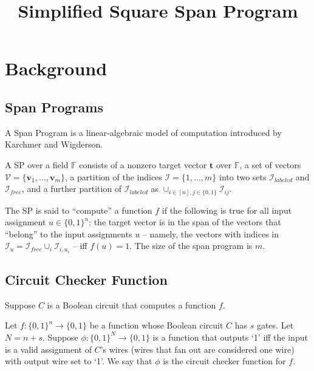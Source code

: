 \documentclass[lnbip]{svmultln}
\begin{document}
%

\mainmatter              %
%
\title{Simplified Square Span Program}
%
\author{}%
%
\institute{}%

\maketitle              %
%
\section{Background}
\subsection{Span Programs}
A Span Program is a linear-algebraic model of computation introduced by Karchmer and Wigderson\cite{gennaro2013quadratic}\cite{karchmer1993span}.
\begin{definition}
 A SP over a field $\mathbb{F}$ consists of a nonzero target vector $\textbf{t}$ over $\mathbb{F}$, a set of vectors $\mathcal{V}=\{\textbf{v}_1,...,\textbf{v}_m\}$, a partition of the indices $\mathcal{I}=\{1,...,m\}$ into two sets $\mathcal{I}_{labeled}$ and $\mathcal{I}_{free}$, and a further partition of $\mathcal{I}_{labeled}$ as $\cup_{i \in [n],j \in \{0,1\}}\mathcal{I}_{ij}$. 
\end{definition}
The SP is said to ``compute'' a function $f$ if the following is true for all input assignment $u \in \{0,1\}^n$: the target vector is in the span of the vectors that ``belong'' to the input assignments $u$ -- namely, the vectors with indices in $\mathcal{I}_u = \mathcal{I}_{free}\cup_i \mathcal{I}_{i,u_i}$ -- iff $f(u)=1$. The size of the span program is $m$.


\subsection{Circuit Checker Function}
Suppose $C$ is a Boolean circuit that computes a function $f$.
\begin{definition}
Let $f:\{0,1\}^n \rightarrow \{0,1\}$ be a function whose Boolean circuit $C$ has $s$ gates. Let $N=n+s$. Suppose $\phi:\{0,1\}^N \rightarrow \{0,1\}$ is a function that outputs `1' iff the input is a valid assignment of $C$'s wires (wires that fan out are considered one wire) with output wire set to `1'. We say that $\phi$ is the circuit checker function for $f$.
\end{definition}
\end{document}
